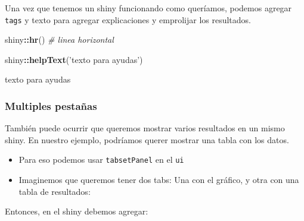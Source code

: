 \documentclass[]{book}
\newenvironment{Shaded}{\begin{snugshade}}{\end{snugshade}}
\newcommand{\CommentTok}[1]{\textcolor[rgb]{0.56,0.35,0.01}{\textit{#1}}}
\newcommand{\KeywordTok}[1]{\textcolor[rgb]{0.13,0.29,0.53}{\textbf{#1}}}
\newcommand{\NormalTok}[1]{#1}
\newcommand{\OperatorTok}[1]{\textcolor[rgb]{0.81,0.36,0.00}{\textbf{#1}}}
\newcommand{\StringTok}[1]{\textcolor[rgb]{0.31,0.60,0.02}{#1}}
\begin{document}
Una vez que tenemos un shiny funcionando como queríamos, podemos agregar \texttt{tags} y texto para agregar explicaciones y emprolijar los resultados.

\begin{Shaded}
\end{Shaded}

\begin{Shaded}
\begin{Highlighting}[]
\NormalTok{shiny}\OperatorTok{::}\KeywordTok{hr}\NormalTok{() }\CommentTok{# linea horizontal}
\end{Highlighting}
\end{Shaded}

\begin{Shaded}
\begin{Highlighting}[]
\NormalTok{shiny}\OperatorTok{::}\KeywordTok{helpText}\NormalTok{(}\StringTok{'texto para ayudas'}\NormalTok{)}
\end{Highlighting}
\end{Shaded}

{texto para ayudas}

\hypertarget{multiples-pestanas}{%
\subsubsection{Multiples pestañas}\label{multiples-pestanas}}

También puede ocurrir que queremos mostrar varios resultados en un mismo shiny. En nuestro ejemplo, podríamos querer mostrar una tabla con los datos.

\begin{itemize}
\item
  Para eso podemos usar \texttt{tabsetPanel} en el \texttt{ui}
\item
  Imaginemos que queremos tener dos tabs: Una con el gráfico, y otra con una tabla de resultados:
\end{itemize}

Entonces, en el shiny debemos agregar:
\end{document}
